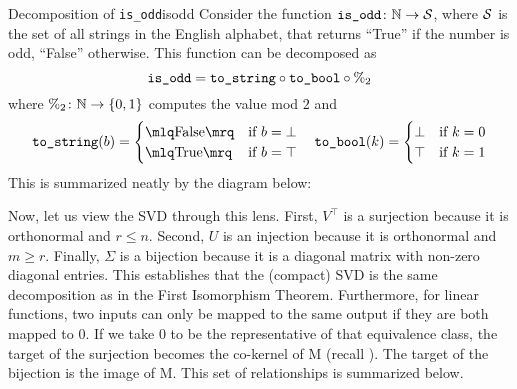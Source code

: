 \documentclass[../../thesis.tex]{subfiles}
\begin{document}
\begin{example}{Decomposition of \texttt{is\_odd}}{isodd}
	Consider the function $\texttt{is\_odd}\colon \mathbb{N} \to {\mathcal{S}}$,
	where ${\mathcal{S}}$ is the set of all strings in the English alphabet,
	that returns \enquote{True} if the number is odd,
	\enquote{False} otherwise.
	This function can be decomposed as
	\begin{equation}
		\texttt{is\_odd} = \texttt{to\_string} \circ \texttt{to\_bool} \circ {\%}_2
	\end{equation}
	where $\%_2\colon\mathbb{N} \to \left\{0, 1\right\}$
	computes the value mod $2$ and
	\begin{equation*}
		\texttt{to\_string}(b) = %
			\begin{cases}
				\mlq \text{False} \mrq & \text{if } b = \bot \\
				\mlq \text{True} \mrq & \text{if } b = \top
			\end{cases} \quad
		\texttt{to\_bool}(k) = %
			\begin{cases}
			     \bot  & 	\text{if } k = 0 \\
			     \top  & 	\text{if } k = 1
			\end{cases}
	\end{equation*}
	This is summarized neatly by the diagram below:
	\begin{center}
	\end{center}
\end{example}

Now, let us view the SVD through this lens.
First, $V^\top$ is a surjection because
it is orthonormal and $r \leq n$.
Second, $U$ is an injection because
it is orthonormal and $m \geq r$.
Finally, $\Sigma$ is a bijection
because it is a diagonal matrix with non-zero diagonal entries.
This establishes that the (compact) SVD
is the same decomposition as in the First Isomorphism Theorem.
Furthermore, for linear functions,
two inputs can only be mapped to the same output
if they are both mapped to $0$.
If we take $0$ to be the representative of that equivalence class,
the target of the surjection becomes the co-kernel of M
(recall ).
The target of the bijection is the image of M.
This set of relationships is summarized below.
\end{document}
